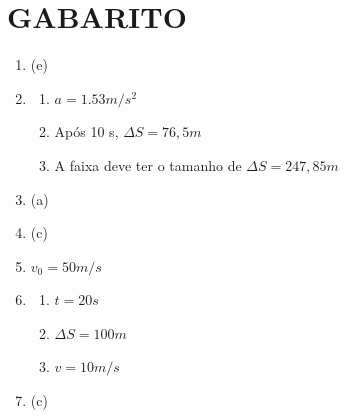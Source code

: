 \documentclass[12pt]{extarticle}
\newcommand{\<}{\langle}
\renewcommand{\>}{\rangle}
\theoremstyle{definition}
\begin{document}
        \pagebreak
        
        \section*{GABARITO}
        
        \begin{enumerate}
            \item (e)
            \item
            \begin{enumerate}
                \item $a=1.53 m/s^2$
                \item Após 10 s, $\Delta S =76,5m$
                \item A faixa deve ter o tamanho de $\Delta S = 247,85 m$
            \end{enumerate}
            
            \item (a)
            \item (c)
            \item $v_0 = 50 m/s$
            \item \begin{enumerate}
                \item $t = 20s$
                \item $\Delta S = 100m$
                \item $v = 10 m/s$
            \end{enumerate}
            
            \item (c)
        \end{enumerate}
\end{document}
